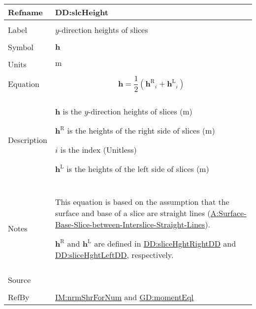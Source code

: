\documentclass[12pt]{article}
\begin{document}
\vspace{\baselineskip}
\noindent
\begin{minipage}{\textwidth}
\begin{tabular}{>{\raggedright}p{}>{\raggedright\arraybackslash}p{}}
\toprule \textbf{Refname} & \textbf{DD:slcHeight}
\label{DD:slcHeight}
\\ \midrule \\
Label & $y$-direction heights of slices
        
\\ \midrule \\
Symbol & $\symbf{h}$
         
\\ \midrule \\
Units & ${\text{m}}$
        
\\ \midrule \\
Equation & \begin{displaymath}
           \symbf{h}=\frac{1}{2} \left({{\symbf{h}^{\text{R}}}}_{i}+{{\symbf{h}^{\text{L}}}}_{i}\right)
           \end{displaymath}
\\ \midrule \\
Description & \begin{symbDescription}
              \item{$\symbf{h}$ is the $y$-direction heights of slices (${\text{m}}$)}
              \item{${\symbf{h}^{\text{R}}}$ is the heights of the right side of slices (${\text{m}}$)}
              \item{$i$ is the index (Unitless)}
              \item{${\symbf{h}^{\text{L}}}$ is the heights of the left side of slices (${\text{m}}$)}
              \end{symbDescription}
\\ \midrule \\
Notes & This equation is based on the assumption that the surface and base of a slice are straight lines (\hyperref[assumpSBSBISL]{A:Surface-Base-Slice-between-Interslice-Straight-Lines}).
        
        ${\symbf{h}^{\text{R}}}$ and ${\symbf{h}^{\text{L}}}$ are defined in \hyperref[DD:sliceHghtRightDD]{DD:sliceHghtRightDD} and \hyperref[DD:sliceHghtLeftDD]{DD:sliceHghtLeftDD}, respectively.
        
\\ \midrule \\
Source & \cite{fredlund1977}
         
\\ \midrule \\
RefBy & \hyperref[IM:nrmShrForNum]{IM:nrmShrForNum} and \hyperref[GD:momentEql]{GD:momentEql}
        
\\ \bottomrule
\end{tabular}
\end{minipage}
\end{document}
